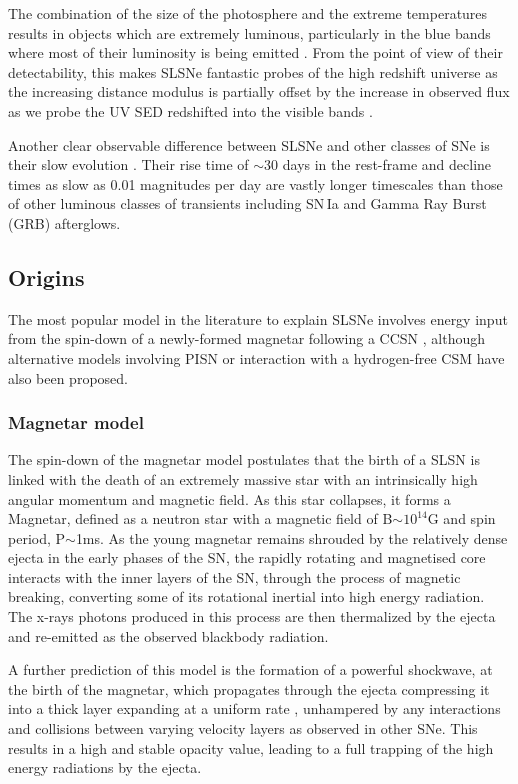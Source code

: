 The combination of the size of the photosphere and the extreme temperatures results in objects which are extremely luminous, particularly in the blue bands \corr{($<$4000\AA)} where most of their luminosity is being emitted \citep{Yan2017}. From the point of view of their detectability, this makes SLSNe fantastic probes of the high redshift universe as the increasing distance modulus is partially offset by the increase in observed flux as we probe the UV SED redshifted into the visible bands \citep{Smith2018}.

Another clear observable difference between SLSNe and other classes of SNe is their slow evolution \citep{Gal-Yam2009, Inserra2013, Nicholl2015a}. Their rise time of $\sim$30 days in the rest-frame and decline times as slow as 0.01 magnitudes per day are vastly longer timescales than those of other luminous classes of transients including SN\,Ia and Gamma Ray Burst (GRB) afterglows.

\subsection{Origins} \label{sec:Origins}
The most popular model in the literature to explain SLSNe involves energy input from the spin-down of a newly-formed magnetar following a CCSN \citep{Kasen2009,Woosley2010,Inserra2013}, although alternative models involving PISN \citep{Woosley2007,Yan2015} or interaction with a hydrogen-free CSM \citep{Chevalier2011,Chatzopoulos2013,Sorokina2015} have also been proposed.

\subsubsection{Magnetar model}
The spin-down of the magnetar model postulates that the birth of a SLSN is linked with the death of an extremely massive star with an intrinsically high angular momentum and magnetic field. As this star collapses, it forms a Magnetar, defined as a neutron star with a magnetic field of B$\sim10^{14}$G and spin period, P$\sim$1ms. As the young magnetar remains shrouded by the relatively dense ejecta in the early phases of the SN, the rapidly rotating and magnetised core interacts with the inner layers of the SN, through the process of magnetic breaking, converting some of its rotational inertial into high energy radiation. The x-rays photons produced in this process are then thermalized by the ejecta and re-emitted as the observed blackbody radiation.

A further prediction of this model is the formation of a powerful shockwave, at the birth of the magnetar, which propagates through the ejecta compressing it into a thick layer \citep{Jerkstrand2016,Chen2018} expanding at a uniform rate \citep{Inserra2013}, unhampered by any interactions and collisions between varying velocity layers as observed in other SNe. This results in a high and stable opacity value, leading to a full trapping of the high energy radiations by the ejecta.

